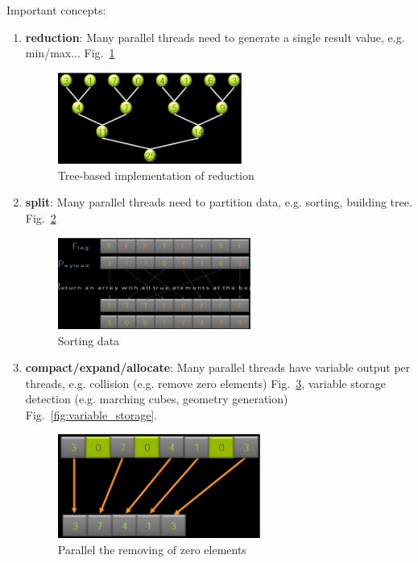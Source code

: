 Important concepts:
\begin{enumerate}
\item {\bf reduction}: Many parallel threads need to generate a single
  result value, e.g. min/max... Fig.~\ref{fig:reduction}
\begin{figure}[hbt]
  \centerline{\includegraphics[height=3cm,
    angle=0]{./images/reduction.eps}}
  \caption{Tree-based implementation of reduction}
\label{fig:reduction}
\end{figure}

\item {\bf split}: Many parallel threads need to partition data,
  e.g. sorting, building tree. Fig.~\ref{fig:split}
\begin{figure}[hbt]
  \centerline{\includegraphics[height=3cm,
    angle=0]{./images/split.eps}}
\caption{Sorting data}
\label{fig:split}
\end{figure}

\item {\bf compact/expand/allocate}: Many parallel threads have
  variable output per threads, e.g. collision (e.g. remove zero
  elements) Fig.~\ref{fig:compact}, variable storage detection
  (e.g. marching cubes, geometry generation)
  Fig.~\ref{fig:variable_storage}.
\begin{figure}[hbt]
  \centerline{\includegraphics[height=3.4cm,
    angle=0]{./images/compact.eps}}
  \caption{Parallel the removing of zero elements}
\label{fig:compact}
\end{figure}


\end{enumerate}
